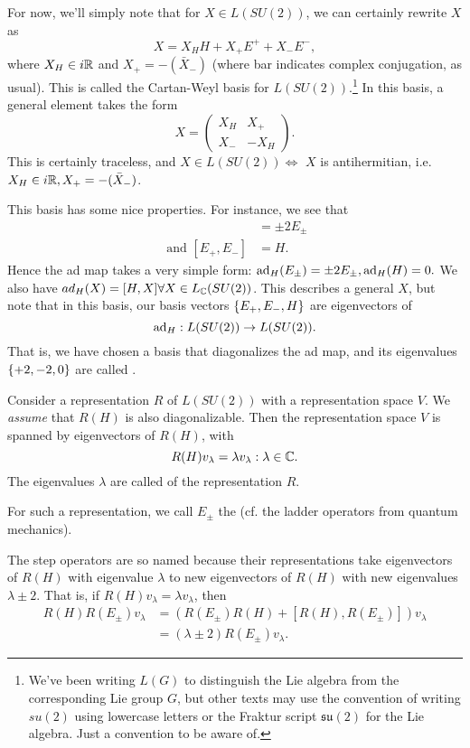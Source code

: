 For now, we'll simply note that for $X\in L(SU(2))$, we can certainly rewrite $X$ as
$$X=X_H H + X_+ E^++ X_- E^-,$$
where $X_H\in i\mathbb{R}$ and $X_+=-(\bar X_-)$ (where bar indicates complex conjugation, as usual). This is called the Cartan-Weyl basis for $L(SU(2))$.\footnote{We've been writing $L(G)$ to distinguish the Lie algebra from the corresponding Lie group $G$, but other texts may use the convention of writing $su(2)$ using lowercase letters or the Fraktur script $\mathfrak{su}(2)$ for the Lie algebra. Just a convention to be aware of.}
In this basis, a general element takes the form
%
$$X=\begin{pmatrix}
    X_H & X_+\\
    X_-&-X_H
\end{pmatrix}.$$
%
This is certainly traceless, and $X\in L(SU(2))\iff$ $X$ is antihermitian, i.e. $X_H\in i\mathbb{R}, X_+ = -(\bar X_-)$.

This basis has some nice properties. For instance, we see that
\begin{align*}
    [H,E_\pm] &= \pm 2 E_\pm\\
    \text{ and } [E_+,E_-] &= H.
\end{align*}
Hence the ad map takes a very simple form:
$\operatorname{ad}_H(E_\pm)=\pm 2 E_\pm, \operatorname{ad}_H(H)=0.$
We also have $ad_H(X)=[H,X]\forall X \in L_{\mathbb{C}}(SU(2))$. This describes a general $X$, but note that in this basis, our basis vectors $\{E_+,E_-,H\}$ are eigenvectors of
$$\operatorname{ad}_H:L(SU(2))\to L(SU(2)).$$
That is, we have chosen a basis that diagonalizes the ad map, and its eigenvalues $\{+2,-2,0\}$ are called .

\begin{defn}
Consider a representation $R$ of $L(SU(2))$ with a representation space $V$. We \emph{assume} that $R(H)$ is also diagonalizable. Then the representation space $V$ is spanned by eigenvectors of $R(H)$, with
$$R(H)v_\lambda = \lambda v_\lambda: \lambda \in \mathbb{C}.$$
The eigenvalues $\lambda$ are called  of the representation $R$.
\end{defn}
\begin{defn}
For such a representation, we call $E_\pm$ the  (cf. the ladder operators from quantum mechanics).
\end{defn}
The step operators are so named because their representations take eigenvectors of $R(H)$ with eigenvalue $\lambda$ to new eigenvectors of $R(H)$ with new eigenvalues $\lambda \pm 2$. That is, if $R(H)v_\lambda = \lambda v_\lambda$, then
\begin{align*}
    R(H)R(E_\pm)v_\lambda &= (R(E_\pm)R(H) + [R(H),R(E_\pm)]) v_\lambda\\
    &=(\lambda \pm 2) R(E_\pm)v_\lambda.
\end{align*}

